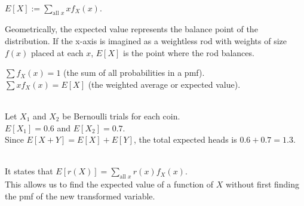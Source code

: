 \documentclass[12pt]{article}
\begin{document}
\begin{enumerate}

\\
$E[X] := \sum_{\text{all } x} x f_X(x)$. 

Geometrically, the expected value represents the balance point of the distribution. If the x-axis is imagined as a weightless rod with weights of size $f(x)$ placed at each $x$, $E[X]$ is the point where the rod balances.



$\sum f_X(x) = 1$ (the sum of all probabilities in a pmf). \\ $\sum x f_X(x) = E[X]$ (the weighted average or expected value).



\\
Let $X_1$ and $X_2$ be Bernoulli trials for each coin.\\ $E[X_1] = 0.6$ and $E[X_2] = 0.7$. \\Since $E[X+Y] = E[X] + E[Y]$, the total expected heads is $0.6 + 0.7 = \mathbf{1.3}$.  


\\
It states that $E[r(X)] = \sum_{\text{all } x} r(x) f_X(x)$. \\This allows us to find the expected value of a function of $X$ without first finding the pmf of the new transformed variable.  
\newpage
{}


\end{enumerate}
\end{document}
